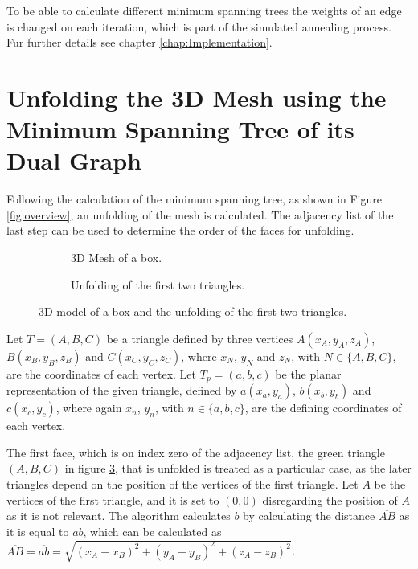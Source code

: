 \documentclass[draft,final]{vutinfth} %
\begin{document}
To be able to calculate different minimum spanning trees the weights of an edge is changed on each iteration, which is part of the simulated annealing process. Fur further details see chapter \ref{chap:Implementation}.

\section{Unfolding the 3D Mesh using the Minimum Spanning Tree of its Dual Graph}
\label{sec:unfold}
Following the calculation of the minimum spanning tree, as shown in Figure \ref{fig:overview}, an unfolding of the mesh is calculated. The adjacency list of the last step can be used to determine the order of the faces for unfolding.

\begin{figure}
\centering
\begin{subfigure}[t]{.4\textwidth}
	
  \caption{3D Mesh of a box.}
	\label{fig:unfold3d}
\end{subfigure}%
\hspace{.1\textwidth}
\begin{subfigure}[t]{.4\textwidth}
	
	\caption{Unfolding of the first two triangles.}
	\label{fig:unfold2d}
\end{subfigure}
\caption{3D model of a box and the unfolding of the first two triangles.}
\label{fig:unfoldexample}
\end{figure}

Let $T = (A,B,C)$ be a triangle defined by three vertices $A(x_A, y_A, z_A)$, $B(x_B, y_B, z_B)$ and $C(x_C, y_C, z_C)$, where $x_N$, $y_N$ and $z_N$, with $N \in \{A,B,C\}$, are the coordinates of each vertex. Let $T_p = (a, b, c)$ be the planar representation of the given triangle, defined by $a(x_a, y_a)$, $b(x_b, y_b)$ and $c(x_c, y_c)$, where again $x_n$, $y_n$, with $n \in \{a,b,c\}$, are the defining coordinates of each vertex.

The first face, which is on index zero of the adjacency list, the green triangle $(A,B,C)$ in figure \ref{fig:unfoldexample}, that is unfolded is treated as a particular case, as the later triangles depend on the position of the vertices of the first triangle. Let $A$ be the vertices of the first triangle, and it is set to $(0,0)$ disregarding the position of $A$ as it is not relevant. The algorithm calculates $b$ by calculating the distance $\overline{AB}$ as it is equal to $\overline{ab}$, which can be calculated as $\overline{AB} = \overline{ab} = \sqrt{(x_A - x_B)^2 + (y_A - y_B)^2 + (z_A - z_B)^2}$.
\end{document}
